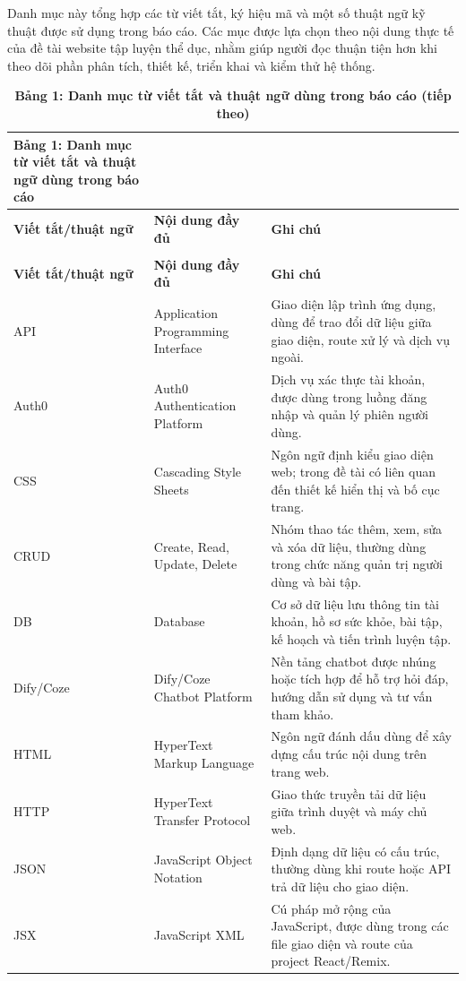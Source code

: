 Danh mục này tổng hợp các từ viết tắt, ký hiệu mã và một số thuật ngữ kỹ thuật được sử dụng trong báo cáo. Các mục được lựa chọn theo nội dung thực tế của đề tài website tập luyện thể dục, nhằm giúp người đọc thuận tiện hơn khi theo dõi phần phân tích, thiết kế, triển khai và kiểm thử hệ thống.

\begin{longtable}{|P{0.19\textwidth}|P{0.34\textwidth}|P{0.39\textwidth}|}
\caption*{\textbf{Bảng 1: Danh mục từ viết tắt và thuật ngữ dùng trong báo cáo}}\\
\hline
\textbf{Viết tắt/thuật ngữ} & \textbf{Nội dung đầy đủ} & \textbf{Ghi chú} \\
\hline
\endfirsthead
\caption*{\textbf{Bảng 1: Danh mục từ viết tắt và thuật ngữ dùng trong báo cáo (tiếp theo)}}\\
\hline
\textbf{Viết tắt/thuật ngữ} & \textbf{Nội dung đầy đủ} & \textbf{Ghi chú} \\
\hline
\endhead
API & Application Programming Interface & Giao diện lập trình ứng dụng, dùng để trao đổi dữ liệu giữa giao diện, route xử lý và dịch vụ ngoài. \\
\hline
Auth0 & Auth0 Authentication Platform & Dịch vụ xác thực tài khoản, được dùng trong luồng đăng nhập và quản lý phiên người dùng. \\
\hline
CSS & Cascading Style Sheets & Ngôn ngữ định kiểu giao diện web; trong đề tài có liên quan đến thiết kế hiển thị và bố cục trang. \\
\hline
CRUD & Create, Read, Update, Delete & Nhóm thao tác thêm, xem, sửa và xóa dữ liệu, thường dùng trong chức năng quản trị người dùng và bài tập. \\
\hline
DB & Database & Cơ sở dữ liệu lưu thông tin tài khoản, hồ sơ sức khỏe, bài tập, kế hoạch và tiến trình luyện tập. \\
\hline
Dify/Coze & Dify/Coze Chatbot Platform & Nền tảng chatbot được nhúng hoặc tích hợp để hỗ trợ hỏi đáp, hướng dẫn sử dụng và tư vấn tham khảo. \\
\hline
HTML & HyperText Markup Language & Ngôn ngữ đánh dấu dùng để xây dựng cấu trúc nội dung trên trang web. \\
\hline
HTTP & HyperText Transfer Protocol & Giao thức truyền tải dữ liệu giữa trình duyệt và máy chủ web. \\
\hline
JSON & JavaScript Object Notation & Định dạng dữ liệu có cấu trúc, thường dùng khi route hoặc API trả dữ liệu cho giao diện. \\
\hline
JSX & JavaScript XML & Cú pháp mở rộng của JavaScript, được dùng trong các file giao diện và route của project React/Remix. \\

\end{longtable}
